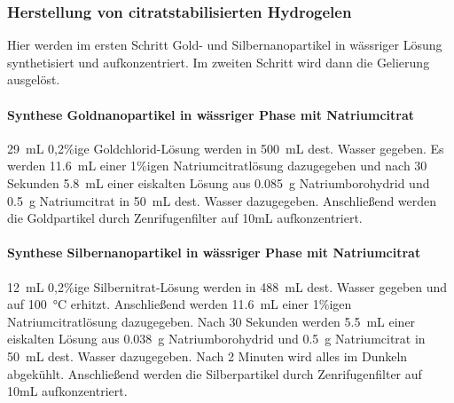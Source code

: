 		\subsubsection{Herstellung von citratstabilisierten Hydrogelen}
			Hier werden im ersten Schritt Gold- und Silbernanopartikel in wässriger Lösung synthetisiert und aufkonzentriert.
			Im zweiten Schritt wird dann die Gelierung ausgelöst. \autocite{Bigall2009} 
		 
			\paragraph{Synthese Goldnanopartikel in wässriger Phase mit Natriumcitrat}
			
			\SI{29}{\milli\liter} 0,2\%ige Goldchlorid-Lösung werden in \SI{500}{\milli\liter} dest. Wasser gegeben.
			Es werden \SI{11,6}{\milli\liter} einer 1\%igen Natriumcitratlösung dazugegeben und nach 30 Sekunden \SI{5,8}{\milli\liter}	einer eiskalten Lösung aus \SI{0,085}{\gram} Natriumborohydrid und \SI{0,5}{\gram} Natriumcitrat in \SI{50}{\milli\liter} dest. Wasser dazugegeben.
			Anschließend werden die Goldpartikel durch Zenrifugenfilter auf 10mL aufkonzentriert.
			
			\paragraph{Synthese Silbernanopartikel in wässriger Phase mit Natriumcitrat}
			
			\SI{12}{\milli\liter} 0,2\%ige Silbernitrat-Lösung werden in \SI{488}{\milli\liter} dest. Wasser gegeben und auf \SI{100}{\degreeCelsius} erhitzt.
			Anschließend werden \SI{11,6}{\milli\liter} einer 1\%igen Natriumcitratlösung dazugegeben.
			Nach 30 Sekunden werden  \SI{5,5}{\milli\liter}	einer eiskalten Lösung aus \SI{0,038}{\gram} Natriumborohydrid und \SI{0,5}{\gram} Natriumcitrat in \SI{50}{\milli\liter} dest. Wasser dazugegeben.
			Nach 2 Minuten wird alles im Dunkeln abgekühlt.
			Anschließend werden die Silberpartikel durch Zenrifugenfilter auf 10mL aufkonzentriert.
			
